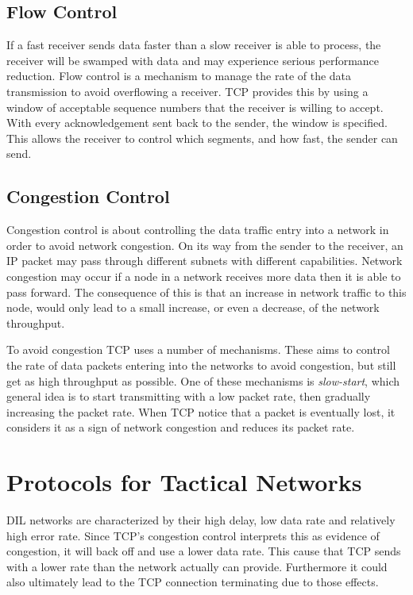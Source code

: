 \subsection{Flow Control}

If a fast receiver sends data faster than a slow receiver is able to process,
the receiver will be swamped with data and may experience serious performance
reduction. Flow control is a mechanism to manage the rate of the data
transmission to avoid overflowing a receiver. TCP provides this by using a
window of acceptable sequence numbers that the receiver is willing to accept.
With every acknowledgement sent back to the sender, the window is specified.
This allows the receiver to control which segments, and how fast, the sender
can send.

\subsection{Congestion Control}

Congestion control is about controlling the data traffic entry into a network in
order to avoid network congestion. On its way from the sender to the receiver,
an IP packet may pass through different subnets with different capabilities.
Network congestion may occur if a node in a network receives more data then it
is able to pass forward. The consequence of this is that an increase in network
traffic to this node, would only lead to a small increase, or even a decrease,
of the network throughput\cite{Al-Bahadili2012}.

To avoid congestion TCP uses a number of mechanisms. These aims to control the
rate of data packets entering into the networks to avoid congestion, but still
get as high throughput as possible. One of these mechanisms is
\textit{slow-start}, which general idea is to start transmitting with a low
packet rate, then gradually increasing the packet rate. When TCP notice that a
packet is eventually lost, it considers it as a sign of network congestion and
reduces its packet rate.

\section{Protocols for Tactical Networks}

DIL networks are characterized by their high delay, low data rate and relatively
high error rate. Since TCP's congestion control interprets this as evidence of
congestion, it will back off and use a lower data rate. This cause that TCP
sends with a lower rate than the network actually can provide. Furthermore it
could also ultimately lead to the TCP connection terminating due to those
effects\cite{nato-disadvantaged-grids}.

